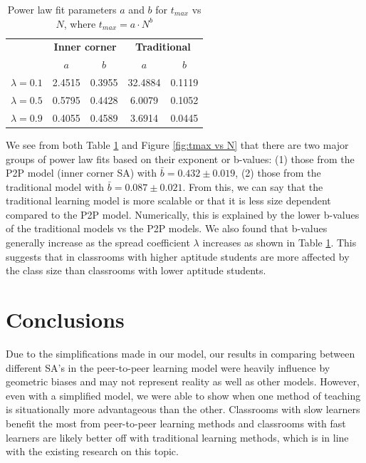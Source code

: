 \documentclass[10pt,a4paper,twoside]{article}
\begin{document}
\begin{table}[h]
  \centering
  
  \begin{tabular}{|c|cc|cc|}
    \hline
    & \multicolumn{2}{c|}{\textbf{Inner corner}}       & \multicolumn{2}{c|}{\textbf{Traditional}}        \\ \cline{2-5} 
    & \multicolumn{1}{c|}{\textbf{$a$}} & \textbf{$b$} & \multicolumn{1}{c|}{\textbf{$a$}} & \textbf{$b$} \\ \hline
    \textbf{$\lambda=0.1$} & \multicolumn{1}{c|}{2.4515}       & 0.3955       & \multicolumn{1}{c|}{32.4884}      & 0.1119       \\ \hline
    \textbf{$\lambda=0.5$} & \multicolumn{1}{c|}{0.5795}       & 0.4428       & \multicolumn{1}{c|}{6.0079}       & 0.1052       \\ \hline
    \textbf{$\lambda=0.9$} & \multicolumn{1}{c|}{0.4055}       & 0.4589       & \multicolumn{1}{c|}{3.6914}       & 0.0445       \\ \hline
  \end{tabular}
  \caption{Power law fit parameters $a$ and $b$ for $t_{max}$ vs $N$, where $t_{max}=a \cdot N ^ b$}
  \label{tab:tmax vs N fit params}
\end{table}

\noindent We see from both Table \ref{tab:tmax vs N fit params} and Figure \ref{fig:tmax vs N} that there are two major groups of power law fits based on their exponent or b-values: (1) those from the P2P model (inner corner SA) with $\bar{b} = 0.432 \pm 0.019$, (2) those from the traditional model with $\bar{b}=0.087\pm0.021$. From this, we can say that the traditional learning model is more scalable or that it is less size dependent compared to the P2P model. Numerically, this is explained by the lower b-values of the traditional models vs the P2P models. We also found that b-values generally increase as the spread coefficient $\lambda$ increases as shown in Table \ref{tab:tmax vs N fit params}. This suggests that in classrooms with higher aptitude students are more affected by the class size than classrooms with lower aptitude students.


\section{Conclusions}
Due to the simplifications made in our model, our results in comparing between different SA's in the peer-to-peer learning model were heavily influence by geometric biases and may not represent reality as well as other models. However, even with a simplified model, we were able to show when one method of teaching is situationally more advantageous than the other. Classrooms with slow learners benefit the most from peer-to-peer learning methods and classrooms with fast learners are likely better off with traditional learning methods, which is in line with the existing research on this topic.
\end{document}
